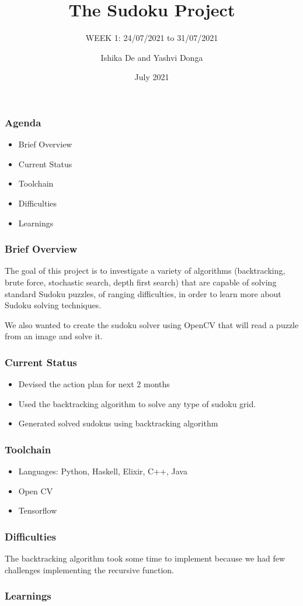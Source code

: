\documentclass{beamer}
\title{The Sudoku Project}
\subtitle{WEEK 1: 24/07/2021 to 31/07/2021}
\author[Ishika | Yashvi]{Ishika De and Yashvi Donga}
\date{July 2021}
\begin{document}
\begin{frame}
     \titlepage
\end{frame}
\begin{frame}
     \frametitle{Agenda}
     \begin{itemize}
          \item Brief Overview
          \item Current Status
          \item Toolchain
          \item Difficulties
          \item Learnings
     \end{itemize}
\end{frame}

\begin{frame}
     \frametitle{Brief Overview}
     The goal of this project is to investigate a variety of algorithms (backtracking, brute force, stochastic search, depth first search) that are capable of solving
standard Sudoku puzzles, of ranging difficulties, in order to learn more about Sudoku
solving techniques.\newline

     We also wanted to create the sudoku solver using OpenCV that will read a puzzle from an image and solve it.
\end{frame}
\begin{frame}
     \frametitle{Current Status}   
     \begin{itemize}
          \item Devised the action plan for next 2 months
          \item Used the backtracking algorithm to solve any type of sudoku grid.
          \item Generated solved sudokus using backtracking algorithm
     \end{itemize}
\end{frame}


\begin{frame}
     \frametitle{Toolchain}
     \begin{itemize}
          \item Languages: Python, Haskell, Elixir, C++, Java
          \item Open CV
          \item Tensorflow
     \end{itemize}
\end{frame}

\begin{frame}
     \frametitle{Difficulties}
     The backtracking algorithm took some time to implement because we had few challenges implementing the recursive function.
\end{frame}

\begin{frame}
     \frametitle{Learnings}
\end{frame}
\end{document}
